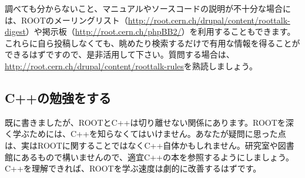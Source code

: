 調べても分からないこと、マニュアルやソースコードの説明が不十分な場合には、ROOTのメーリングリスト（\url{http://root.cern.ch/drupal/content/roottalk-digest}）や掲示板（\url{http://root.cern.ch/phpBB2/}）を利用することもできます。これらに自ら投稿しなくても、眺めたり検索するだけで有用な情報を得ることができるはずですので、是非活用して下さい。質問する場合は、\url{http://root.cern.ch/drupal/content/roottalk-rules}を熟読しましょう。

\subsection{C++の勉強をする}
既に書きましたが、ROOTとC++は切り離せない関係にあります。ROOTを深く学ぶためには、C++を知らなくてはいけません。あなたが疑問に思った点は、実はROOTに関することではなくC++自体かもしれません。研究室や図書館にあるもので構いませんので、適宜C++の本を参照するようにしましょう。C++を理解できれば、ROOTを学ぶ速度は劇的に改善するはずです。
